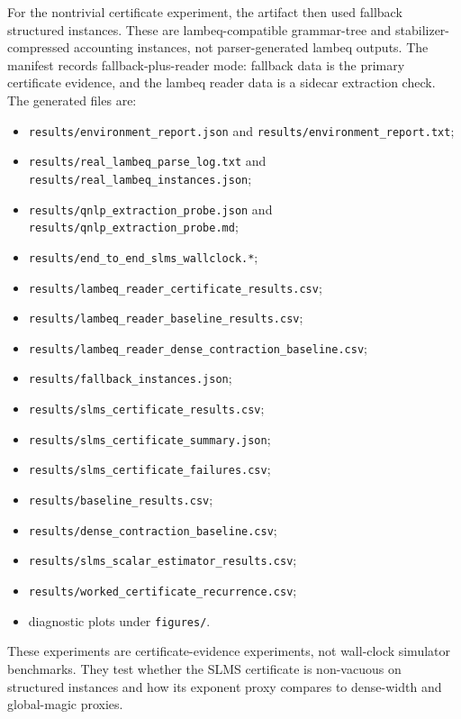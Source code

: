 For the nontrivial certificate experiment, the artifact then used fallback structured instances. These are lambeq-compatible grammar-tree and stabilizer-compressed accounting instances, not parser-generated lambeq outputs. The manifest records fallback-plus-reader mode: fallback data is the primary certificate evidence, and the lambeq reader data is a sidecar extraction check. The generated files are:
\begin{itemize}[leftmargin=1.2cm]
\item \texttt{results/environment\_report.json} and \texttt{results/environment\_report.txt};
\item \texttt{results/real\_lambeq\_parse\_log.txt} and \texttt{results/real\_lambeq\_instances.json};
\item \texttt{results/qnlp\_extraction\_probe.json} and \texttt{results/qnlp\_extraction\_probe.md};
\item \texttt{results/end\_to\_end\_slms\_wallclock.*};
\item \texttt{results/lambeq\_reader\_certificate\_results.csv};
\item \texttt{results/lambeq\_reader\_baseline\_results.csv};
\item \texttt{results/lambeq\_reader\_dense\_contraction\_baseline.csv};
\item \texttt{results/fallback\_instances.json};
\item \texttt{results/slms\_certificate\_results.csv};
\item \texttt{results/slms\_certificate\_summary.json};
\item \texttt{results/slms\_certificate\_failures.csv};
\item \texttt{results/baseline\_results.csv};
\item \texttt{results/dense\_contraction\_baseline.csv};
\item \texttt{results/slms\_scalar\_estimator\_results.csv};
\item \texttt{results/worked\_certificate\_recurrence.csv};
\item diagnostic plots under \texttt{figures/}.
\end{itemize}

These experiments are certificate-evidence experiments, not wall-clock simulator benchmarks. They test whether the SLMS certificate is non-vacuous on structured instances and how its exponent proxy compares to dense-width and global-magic proxies.

